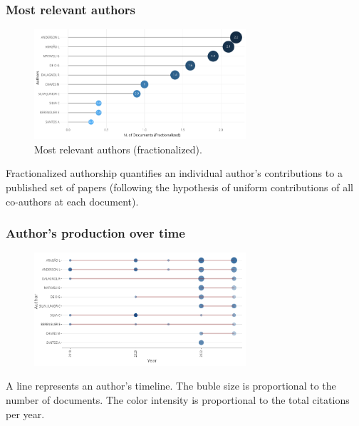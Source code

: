 \documentclass[aspectratio=169]{beamer}
\begin{document}
\begin{frame}
  \frametitle{Most relevant authors}
  \begin{figure}
    \centering
    \includegraphics[width=0.7\textwidth]
    {img/most_relevant_authors_fractionalized.png}
    \caption{Most relevant authors (fractionalized).}
    \label{fig:most_relevant_authors_fractionalized}
  \end{figure}
  Fractionalized authorship quantifies an individual author's contributions to 
  a published set of papers (following the hypothesis of uniform contributions
  of all co-authors at each document).
\end{frame}

\begin{frame}
  \frametitle{Author's production over time}
  \begin{figure}
    \centering
    \includegraphics[width=0.7\textwidth]
    {img/authors_production_over_time.png}
    \label{fig:authors_production_over_time}
  \end{figure}
  A line represents an author's timeline.
  The buble size is proportional to the number of documents. 
  The color intensity is proportional to the total citations per year.
\end{frame}
\end{document}
